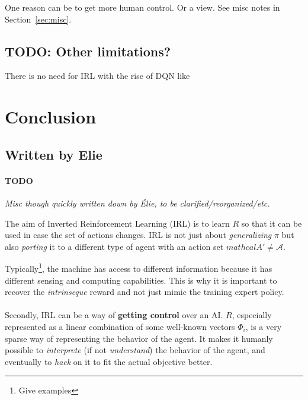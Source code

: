 \documentclass{article}
\begin{document}
One reason can be to get more human control. Or a view. See misc notes in Section~\ref{sec:misc}.

\subsection{TODO: Other limitations?}

There is no need for IRL with the rise of DQN like \cite{Mnih15}


\section{Conclusion}


\subsection{Written by Elie \label{sec:misc}}

\paragraph{TODO}
\emph{Misc though quickly written down by Élie, to be clarified/reorganized/etc.}

The aim of Inverted Reinforcement Learning (IRL) is to learn $R$ so that it can be used in case the set of actions changes. IRL is not just about \emph{generalizing} $\pi$ but also \emph{porting} it to a different type of agent with an action set $mathcal A' \neq \mathcal A$. %

Typically\footnote{Give examples}, the machine has access to different information because it has different sensing and computing capabilities. This is why it is important to recover the \emph{intrinseque} reward and not just mimic the training expert policy.

\paragraph{}
Secondly, IRL can be a way of \textbf{getting control} over an AI. $R$, especially represented as a linear combination of some well-known vectors $\Phi_i$, is a very sparse way of representing the behavior of the agent. It makes it humanly possible to \emph{interprete} (if not \emph{understand}) the behavior of the agent, and eventually to \emph{hack} on it to fit the actual objective better.
\end{document}
